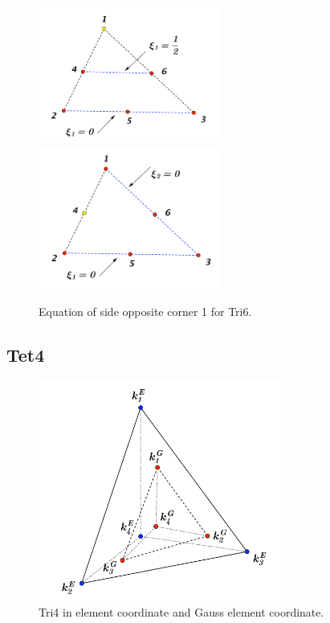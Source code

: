 \begin{figure}[h]
	\begin{center}
		\includegraphics[width=6cm,clip]{Tri6_2.pdf}		
		\includegraphics[width=6cm,clip]{Tri6_3.pdf}		
		\caption{Equation of side opposite corner 1 for Tri6.} \label{fig: Tri6_2}
		
	\end{center} 
\end{figure}


\subsection{Tet4}

\begin{figure}[h]
	\begin{center}
		\includegraphics[width=8cm,clip]{Tet4_1.pdf}			
		\caption{Tri4 in element coordinate and Gauss element coordinate.}
	\end{center} 
\end{figure}

